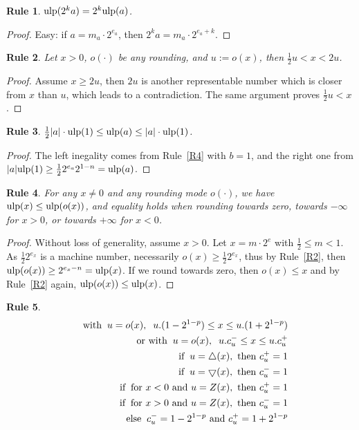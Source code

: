\documentclass[12pt]{amsart}
\def\n{\textnormal}
\def\pinf{\bigtriangleup}
\def\minf{\bigtriangledown}
\def\ulp{{\rm ulp}}
\newtheorem{Rule}{Rule}
\begin{document}
\begin{Rule} \label{R5}
$\ulp(2^k a) = 2^k \ulp(a)$.
\end{Rule}
\begin{proof}
Easy: if $a = m_a \cdot 2^{e_a}$, then $2^k a = m_a \cdot 2^{e_a+k}$.
\end{proof}

\begin{Rule} \label{R6}
Let $x > 0$, $o(\cdot)$ be any rounding, and $u := o(x)$, then $\frac{1}{2} u
	< x < 2 u$.
\end{Rule}
\begin{proof}
Assume $x \geq 2 u$, then $2u$ is another representable number which is closer 
from $x$ than $u$, which leads to a contradiction. The same argument proves
$\frac{1}{2} u < x$.
\end{proof}

\begin{Rule} \label{R7}
$\frac{1}{2} |a| \cdot \ulp(1) \leq \ulp(a) \leq |a| \cdot \ulp(1)$.
\end{Rule}
\begin{proof}
The left inegality comes from Rule~\ref{R4} with $b=1$,
and the right one from $|a| \ulp(1) \geq \frac{1}{2} 2^{e_a} 2^{1-n} =\ulp(a)$.
\end{proof}

\begin{Rule} \label{R8}
For any $x \neq 0$ and any rounding mode $o(\cdot)$,
we have $\ulp(x) \leq \ulp(o(x))$, and equality holds when rounding towards
zero, towards $-\infty$ for $x>0$, or towards $+\infty$ for $x<0$.
\end{Rule}
\begin{proof}
Without loss of generality, assume $x > 0$.
Let $x = m \cdot 2^e$ with $\frac{1}{2} \leq m < 1$.
As $\frac{1}{2} 2^{e_x}$ is a machine number, necessarily $o(x) \geq
\frac{1}{2} 2^{e_x}$, thus by Rule~\ref{R2}, then $\ulp(o(x)) \geq
2^{e_x - n} = \ulp(x)$.
If we round towards zero, then $o(x) \leq x$ and by Rule~\ref{R2} again,
$\ulp(o(x)) \leq \ulp(x)$.
\end{proof}

\begin{Rule} \label{R9}
\begin{eqnarray}\nonumber
&&\textnormal{with}\;\;  u=o(x),\;\; u.(1-2^{1-p}) \leq x \leq u.(1+2^{1-p})\\\nonumber
&&\;\;\;\;\;\;\textnormal{or with}\;\;  u=o(x),\;\; u.c_u^- \leq x \leq u.c_u^+\\\nonumber
&&\;\;\;\;\;\;\;\;\;\;\;\;\textnormal{if}\;\;  u=\pinf(x),\n{ then } c_u^+=1\\\nonumber
&&\;\;\;\;\;\;\;\;\;\;\;\;\textnormal{if}\;\;  u=\minf(x),\n{ then } c_u^-=1\\\nonumber
&&\;\;\;\;\;\;\;\;\;\;\;\;\textnormal{if}\;\;  \n{for $x<0$ and } u=Z(x),\n{ then } c_u^+=1 \\\nonumber
&&\;\;\;\;\;\;\;\;\;\;\;\;\textnormal{if}\;\;  \n{for $x>0$ and } u=Z(x),\n{ then } c_u^-=1 \\\nonumber
&&\;\;\;\;\;\;\;\;\;\;\;\;\textnormal{else}\;\;   c_u^{-}=1-2^{1-p} \n{ and } c_u^{+}=1+2^{1-p}
\end{eqnarray}
\end{Rule}
\end{document}
